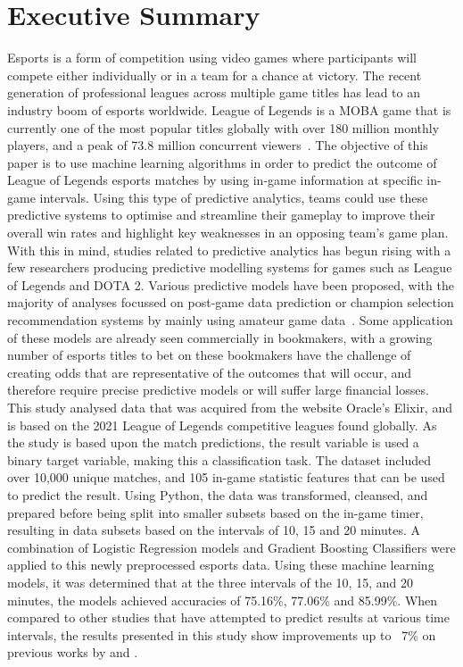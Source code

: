 
\chapter*{Executive Summary}\label{ch:executive summary}


Esports is a form of competition using video games where participants will compete either individually or in a team for a chance at victory.
The recent generation of professional leagues across multiple game titles has lead to an industry boom of esports worldwide.
League of Legends is a MOBA game that is currently one of the most popular titles globally with over 180 million monthly players, and a peak of 73.8 million concurrent viewers~\citep{riotplayercount, upcomerworld2021}.
The objective of this paper is to use machine learning algorithms in order to predict the outcome of League of Legends esports matches by using in-game information at specific in-game intervals.
Using this type of predictive analytics, teams could use these predictive systems to optimise and streamline their gameplay to improve their overall win rates and highlight key weaknesses in an opposing team's game plan.
With this in mind, studies related to predictive analytics has begun rising with a few researchers producing predictive modelling systems for games such as League of Legends and DOTA 2.
Various predictive models have been proposed, with the majority of analyses focussed on post-game data prediction or champion selection recommendation systems by mainly using amateur game data~\citep{ani2019victory, shen2022deep}.
Some application of these models are already seen commercially in bookmakers, with a growing number of esports titles to bet on these bookmakers have the challenge of creating odds that are representative of the outcomes that will occur, and therefore require precise predictive models or will suffer large financial losses. \\


This study analysed data that was acquired from the website Oracle's Elixir, and is based on the 2021 League of Legends competitive leagues found globally.
As the study is based upon the match predictions, the result variable is used a binary target variable, making this a classification task.
The dataset included over 10,000 unique matches, and 105 in-game statistic features that can be used to predict the result.
Using Python, the data was transformed, cleansed, and prepared before being split into smaller subsets based on the in-game timer, resulting in data subsets based on the intervals of 10, 15 and 20 minutes.
A combination of Logistic Regression models and Gradient Boosting Classifiers were applied to this newly preprocessed esports data.
Using these machine learning models, it was determined that at the three intervals of the 10, 15, and 20 minutes, the models achieved accuracies of 75.16\%, 77.06\% and 85.99\%.
When compared to other studies that have attempted to predict results at various time intervals, the results presented in this study show improvements up to ~7\% on previous works by \citet{lee2020predicting} and \citet{silva2018continuous}. \\

